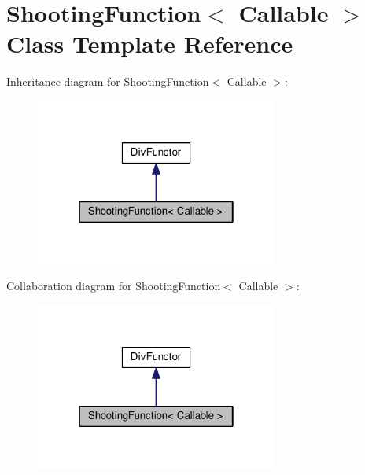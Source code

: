 \hypertarget{classShootingFunction}{}\section{Shooting\+Function$<$ Callable $>$ Class Template Reference}
\label{classShootingFunction}


Inheritance diagram for Shooting\+Function$<$ Callable $>$\+:
\nopagebreak
\begin{figure}[H]
\begin{center}
\leavevmode
\includegraphics[width=226pt]{classShootingFunction__inherit__graph}
\end{center}
\end{figure}


Collaboration diagram for Shooting\+Function$<$ Callable $>$\+:
\nopagebreak
\begin{figure}[H]
\begin{center}
\leavevmode
\includegraphics[width=226pt]{classShootingFunction__coll__graph}
\end{center}
\end{figure}
